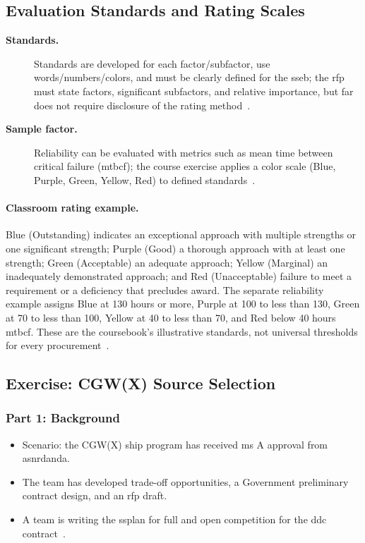 \documentclass[../main.tex]{subfiles}
\begin{document}
\subsection{Evaluation Standards and Rating Scales}
\begin{description}
  \item[\textbf{Standards.}] Standards are developed for each factor/subfactor, use words/numbers/colors, and must be clearly defined for the \ac{sseb}; the \ac{rfp} must state factors, significant subfactors, and relative importance, but \ac{far} does not require disclosure of the rating method~\autocite{edo-3-2-5-source-selection-practical-2025,FAR}.
  \item[\textbf{Sample factor.}] Reliability can be evaluated with metrics such as mean time between critical failure (\ac{mtbcf}); the course exercise applies a color scale (Blue, Purple, Green, Yellow, Red) to defined standards~\autocite{edo-3-2-5-source-selection-practical-2025}.
\end{description}

\paragraph{Classroom rating example.} Blue (Outstanding) indicates an exceptional approach with multiple strengths or one significant strength; Purple (Good) a thorough approach with at least one strength; Green (Acceptable) an adequate approach; Yellow (Marginal) an inadequately demonstrated approach; and Red (Unacceptable) failure to meet a requirement or a deficiency that precludes award. The separate reliability example assigns Blue at 130 hours or more, Purple at 100 to less than 130, Green at 70 to less than 100, Yellow at 40 to less than 70, and Red below 40 hours \ac{mtbcf}. These are the coursebook's illustrative standards, not universal thresholds for every procurement~\autocite{edo-3-2-5-source-selection-practical-2025}.

\subsection{Exercise: CGW(X) Source Selection}
\subsubsection{Part 1: Background}
\begin{itemize}
  \item Scenario: the CGW(X) ship program has received \ac{ms} A approval from \ac{asnrdanda}.
  \item The team has developed trade-off opportunities, a Government preliminary contract design, and an \ac{rfp} draft.
  \item A team is writing the \ac{ssplan} for full and open competition for the \ac{ddc} contract~\autocite{edo-3-2-5-source-selection-practical-2025}.
\end{itemize}
\end{document}
